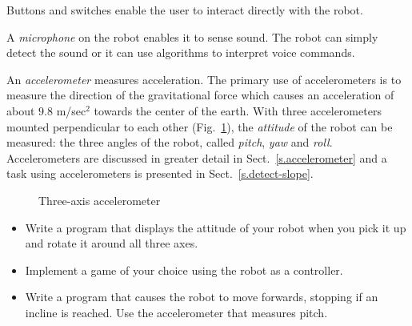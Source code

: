 Buttons and switches enable the user to interact directly with the robot.

A \emph{microphone} on the robot enables it to sense sound. The robot can simply detect the sound or it can use algorithms to interpret voice commands.

An \emph{accelerometer} measures acceleration. The primary use of accelerometers is to measure the direction of the gravitational force which causes an acceleration of about $9.8$ m/sec$^{2}$ towards the center of the earth. With three accelerometers mounted perpendicular to each other (Fig.~\ref{fig.accel}), the \emph{attitude} of the robot can be measured: the three angles of the robot, called \emph{pitch}, \emph{yaw} and \emph{roll}. Accelerometers are discussed in greater detail in Sect.~\ref{s.accelerometer} and a task using accelerometers is presented in Sect.~\ref{s.detect-slope}.

\begin{figure}
\begin{center}
\caption{Three-axis accelerometer}\label{fig.accel}
\end{center}
\end{figure}

\begin{framed}

\begin{itemize}
\item Write a program that displays the attitude of your robot when you pick it up and rotate it around all three axes.

\item Implement a game of your choice using the robot as a controller.

\item Write a program that causes the robot to move forwards, stopping if an incline is reached. Use the accelerometer that measures pitch.
\end{itemize}
\end{framed}

